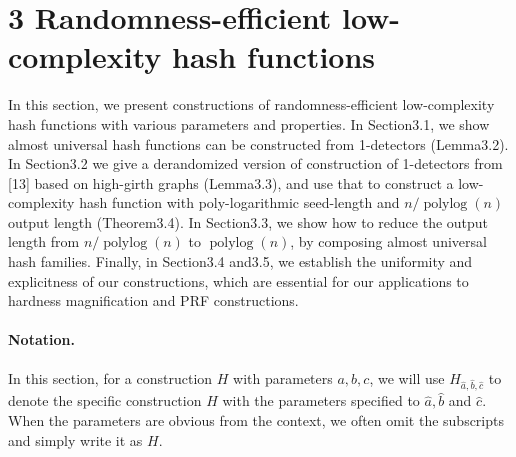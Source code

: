 \section*{3 Randomness-efficient low-complexity hash functions}
In this section, we present constructions of randomness-efficient low-complexity hash functions with various parameters and properties.
In Section3.1, we show almost universal hash functions can be constructed from 1-detectors (Lemma3.2). In Section3.2 we give a derandomized version of construction of 1-detectors from [13] based on high-girth graphs (Lemma3.3), and use that to construct a low-complexity hash function with poly-logarithmic seed-length and $n/\operatorname{polylog}(n)$ output length (Theorem3.4).
In Section3.3, we show how to reduce the output length from $n/\operatorname{polylog}(n)$ to $\operatorname{polylog}(n)$, by composing almost universal hash families. Finally, in Section3.4 and3.5, we establish the uniformity and explicitness of our constructions, which are essential for our applications to hardness magnification and PRF constructions.
\paragraph{Notation.} In this section, for a construction $H$ with parameters $a,b,c$, we will use $H_{\hat a,\hat b,\hat c}$ to denote the specific construction $H$ with the parameters specified to $\hat a,\hat b$ and $\hat c$. When the parameters are obvious from the context, we often omit the subscripts and simply write it as $H$.
